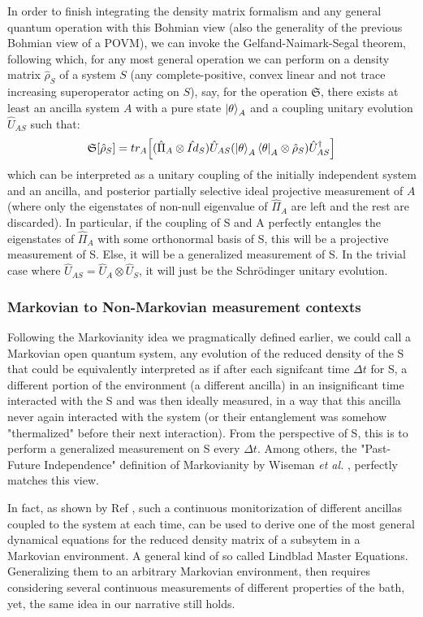 \documentclass[11pt, a4paper]{article} %
\begin{document}
In order to finish integrating the density matrix formalism and any general quantum operation with this Bohmian view (also the generality of the previous Bohmian view of a POVM), we can invoke the Gelfand-Naimark-Segal theorem, following which, for any most general operation we can perform on a density matrix $\hat{\rho}_S$ of a system $S$ (any complete-positive, convex linear and not trace increasing superoperator acting on $S$), say, for the operation $\mathfrak{S}$, there exists at least an ancilla system $A$ with a pure state $\ket{\theta}_A$ and a coupling unitary evolution $\hat{U}_{AS}$ such that:
\begin{equation}
\mathfrak{S}[\hat{\rho}_S]=tr_A\qty[ (\hat{\Pi}_A\otimes \hat{Id}_S)  \hat{U}_{AS}\qty(\ket{\theta}_A\bra{\theta}_A\otimes \hat{\rho}_S)\hat{U}_{AS}^\dagger]
\end{equation}
which can be interpreted as a unitary coupling of the initially independent system and an ancilla, and posterior partially selective ideal projective measurement of $A$ (where only the eigenstates of non-null eigenvalue of $\hat{\Pi}_A$ are left and the rest are discarded). In particular, if the coupling of S and A perfectly entangles the eigenstates of $\hat{\Pi}_A$ with some orthonormal basis of S, this will be a projective measurement of S. Else, it will be a generalized measurement of S. In the trivial case where $\hat{U}_{AS}=\hat{U}_A\otimes\hat{U}_S$, it will just be the Schrödinger unitary evolution.


\subsubsection*{Markovian to Non-Markovian measurement contexts}
Following the Markovianity idea we pragmatically defined earlier, we could call a Markovian open quantum system, any evolution of the reduced density of the S that could be equivalently interpreted as if after each signifcant time $\Delta t$ for S, a different portion of the environment (a different ancilla) in an insignificant time interacted with the S and was then ideally measured, in a way that this ancilla never again interacted with the system (or their entanglement was somehow "thermalized" before their next interaction). From the perspective of S, this is to perform a generalized measurement on S every $\Delta t$. Among others, the "Past-Future Independence" definition of Markovianity by Wiseman {\em et al.} \cite{MarkovianityDefs}, perfectly matches this view.

In fact, as shown by Ref \cite{continousMeas}, such a continuous monitorization of different ancillas coupled to the system at each time, can be used to derive one of the most general dynamical equations for the reduced density matrix of a subsytem in a Markovian environment. A general kind of so called Lindblad Master Equations. Generalizing them to an arbitrary Markovian environment, then requires considering several continuous measurements of different properties of the bath, yet, the same idea in our narrative still holds.
\end{document}
